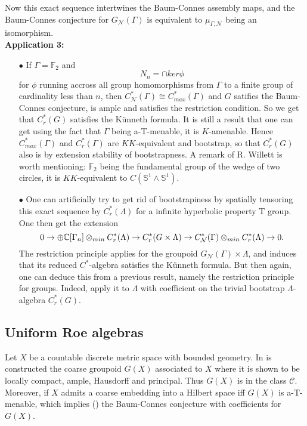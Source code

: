 Now this exact sequence intertwines the Baum-Connes assembly maps, and the Baum-Connes conjecture for $G_{\mathcal N}(\Gamma)$ is equivalent to $\mu_{\Gamma,\mathcal N}$ being an isomorphism. \\

\textbf{Application 3:} 
\begin{itemize}
\item[$\bullet$] If $\Gamma= \mathbb F_2$ and 
\[N_n = \cap ker \phi \]
for $\phi$ running accross all group homomorphisms from $\Gamma$ to a finite group of cardinality less than $n$, then $C_{\mathcal N}^*(\Gamma) \cong C_{max}^*(\Gamma)$ and $G$ satifies the Baum-Connes conjecture, is ample and satisfies the restriction condition. So we get that $C_r^*(G)$ satisfies the Künneth formula. It is still a result that one can get using the fact that $\Gamma$ being a-T-menable, it is $K$-amenable. Hence $C^*_{max}(\Gamma)$ and $C_r^*(\Gamma)$ are $KK$-equivalent and bootstrap, so that $C_r^*(G)$ also is by extension stability of bootstrapness. A remark of R. Willett is worth mentioning: $\mathbb F_2$ being the fundamental group of the wedge of two circles, it is $KK$-equivalent to $C(\mathbb S^1 \wedge \mathbb S^1)$.\\
\item[$\bullet$] One can artificially try to get rid of bootstrapiness by spatially tensoring this exact sequence by $C_r^*(\Lambda)$ for a infinite hyperbolic property T group. One then get the extension
\[ 0 \rightarrow \oplus \mathbb C[\Gamma_n] \otimes_{min} C_r^*(\Lambda) \rightarrow C_r^*(G\times \Lambda) \rightarrow C^*_{\mathcal N} (\Gamma)\otimes_{min} C_r^*(\Lambda)   \rightarrow 0.\]
The restriction principle applies for the groupoid $G_{\mathcal N}(\Gamma)\times\Lambda$, and induces that its reduced $C^*$-algebra satisfies the Künneth formula. But then again, one can deduce this from a previous result, namely the restriction principle for groups. Indeed, apply it to $\Lambda$ with coefficient on the trivial bootstrap $\Lambda$-algebra $C_r^*(G)$.	\\ 
\end{itemize} 


\subsection{Uniform Roe algebras}

Let $X$ be a countable discrete metric space with bounded geometry. In \cite{SkTuYu} is constructed the coarse groupoid $G(X)$ associated to $X$ where it is shown to be locally compact, ample, Hausdorff and principal. Thus $G(X)$ is in the class $\mathcal C$. Moreover, if $X$ admits a coarse embedding into a Hilbert space iff $G(X)$ is a-T-menable, which implies (\cite{TuThese}) the Baum-Connes conjecture with coefficients for $G(X)$.\\

